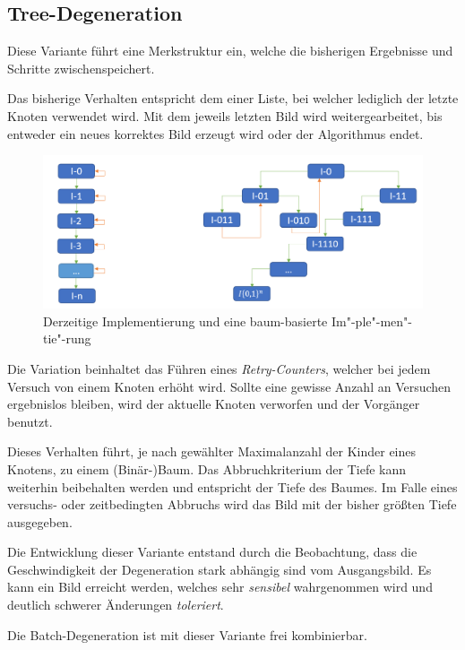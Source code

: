 \subsection{Tree-Degeneration}
Diese Variante führt eine Merkstruktur ein, welche die bisherigen Ergebnisse und Schritte zwischenspeichert. 

Das bisherige Verhalten entspricht dem einer Liste, bei welcher lediglich der letzte Knoten verwendet wird. 
Mit dem jeweils letzten Bild wird weitergearbeitet, bis entweder ein neues korrektes Bild erzeugt wird oder der Algorithmus endet. 
\begin{figure}[h]
	\centering
	\includegraphics[width=0.8\linewidth]{Images/DegenTreeNormal}
	\caption[Tree-Degeneration]{Derzeitige Implementierung und eine baum-basierte Im"-ple"-men"-tie"-rung}
	\label{fig:degentreenormal}
\end{figure}

Die Variation beinhaltet das Führen eines \textit{Retry-Counters}, welcher bei jedem Versuch von einem Knoten erhöht wird.
Sollte eine gewisse Anzahl an Versuchen ergebnislos bleiben, wird der aktuelle Knoten verworfen und der Vorgänger benutzt. 

Dieses Verhalten führt, je nach gewählter Maximalanzahl der Kinder eines Knotens, zu einem (Binär-)Baum. 
Das Abbruchkriterium der Tiefe kann weiterhin beibehalten werden und entspricht der Tiefe des Baumes. 
Im Falle eines versuchs- oder zeitbedingten Abbruchs wird das Bild mit der bisher größten Tiefe ausgegeben.

Die Entwicklung dieser Variante entstand durch die Beobachtung, dass die Geschwindigkeit der Degeneration stark abhängig sind vom Ausgangsbild. 
Es kann ein Bild erreicht werden, welches sehr \textit{sensibel} wahrgenommen wird und deutlich schwerer Änderungen \textit{toleriert}.

Die Batch-Degeneration ist mit dieser Variante frei kombinierbar.  